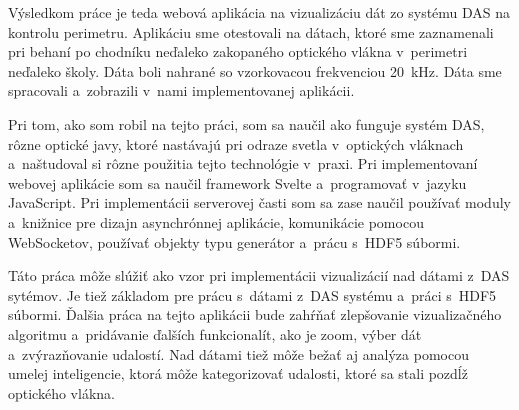 Výsledkom práce je teda webová aplikácia na vizualizáciu dát zo systému DAS na kontrolu perimetru. Aplikáciu sme otestovali na dátach, ktoré sme zaznamenali pri behaní po chodníku neďaleko zakopaného optického vlákna v~perimetri neďaleko školy. Dáta boli nahrané so vzorkovacou frekvenciou \qty{20}{kHz}. Dáta sme spracovali a~zobrazili v~nami implementovanej aplikácii.

Pri tom, ako som robil na tejto práci, som sa naučil ako funguje systém DAS, rôzne optické javy, ktoré nastávajú pri odraze svetla v~optických vláknach a~naštudoval si rôzne použitia tejto technológie v~praxi. Pri implementovaní webovej aplikácie som sa naučil framework Svelte a~programovať v~jazyku JavaScript. Pri implementácii serverovej časti som sa zase naučil používať moduly a~knižnice pre dizajn asynchrónnej aplikácie, komunikácie pomocou WebSocketov, používať objekty typu generátor a~prácu s~HDF5 súbormi.

Táto práca môže slúžiť ako vzor pri implementácii vizualizácií nad dátami z~DAS sytémov. Je tiež základom pre prácu s~dátami z~DAS systému a~práci s~HDF5 súbormi. Ďalšia práca na tejto aplikácii bude zahŕňať zlepšovanie vizualizačného algoritmu a~pridávanie ďalších funkcionalít, ako je zoom, výber dát a~zvýrazňovanie udalostí. Nad dátami tiež môže bežať aj analýza pomocou umelej inteligencie, ktorá môže kategorizovať udalosti, ktoré sa stali pozdĺž optického vlákna.




